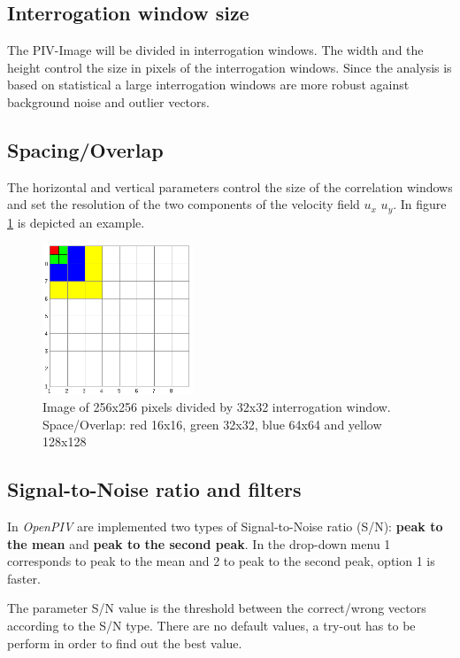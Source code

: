 \subsection{Interrogation window size}\label{Interrogation_Window}
The PIV-Image will be divided in interrogation windows. The width and the height control the size 
in pixels of the interrogation windows. Since the analysis is based on statistical a large 
interrogation windows are more robust against background noise and outlier vectors.

\subsection{Spacing/Overlap}\label{Spacing}
The horizontal and vertical parameters control the size of the correlation windows and set the 
resolution of the two components of the velocity field $u_{x}$ $u_{y}$. In figure \ref{fig:Iwindow} 
is depicted an example.

\begin{figure}[H]
	\centering
	\includegraphics[width=0.4\textwidth]{Images/IntWindow.png}
	\caption{Image of 256x256 pixels divided by 32x32 interrogation window. Space/Overlap: 
                 red 16x16, green 32x32, blue 64x64 and yellow 128x128}
	\label{fig:Iwindow}
\end{figure}

\subsection{Signal-to-Noise ratio and filters}\label{S/N}
In \emph{OpenPIV} are implemented two types of Signal-to-Noise ratio (S/N): \textbf{peak to the mean} and 
\textbf{peak to the second peak}. In the drop-down menu 1 corresponds to peak to the mean and 2 to peak 
to the second peak, option 1 is faster. 


The parameter S/N value is the threshold between the correct/wrong vectors according to the S/N  type. There are no default values, a try-out has to be perform in order to find out the best 
value. 


